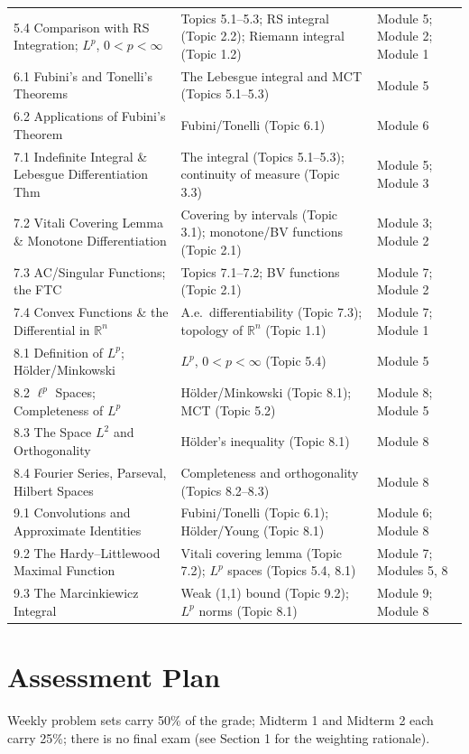 \documentclass[11pt]{article}
\begin{document}
\begin{longtable}{@{}p{5.3cm} p{5.7cm} p{3.4cm}@{}}
5.4 Comparison with RS Integration; $L^p$, $0<p<\infty$ & Topics 5.1--5.3; RS integral (Topic 2.2); Riemann integral (Topic 1.2) & Module 5; Module 2; Module 1 \\
6.1 Fubini's and Tonelli's Theorems & The Lebesgue integral and MCT (Topics 5.1--5.3) & Module 5 \\
6.2 Applications of Fubini's Theorem & Fubini/Tonelli (Topic 6.1) & Module 6 \\
7.1 Indefinite Integral \& Lebesgue Differentiation Thm & The integral (Topics 5.1--5.3); continuity of measure (Topic 3.3) & Module 5; Module 3 \\
7.2 Vitali Covering Lemma \& Monotone Differentiation & Covering by intervals (Topic 3.1); monotone/BV functions (Topic 2.1) & Module 3; Module 2 \\
7.3 AC/Singular Functions; the FTC & Topics 7.1--7.2; BV functions (Topic 2.1) & Module 7; Module 2 \\
7.4 Convex Functions \& the Differential in $\mathbb{R}^n$ & A.e.\ differentiability (Topic 7.3); topology of $\mathbb{R}^n$ (Topic 1.1) & Module 7; Module 1 \\
8.1 Definition of $L^p$; H\"older/Minkowski & $L^p$, $0<p<\infty$ (Topic 5.4) & Module 5 \\
8.2 $\ell^p$ Spaces; Completeness of $L^p$ & H\"older/Minkowski (Topic 8.1); MCT (Topic 5.2) & Module 8; Module 5 \\
8.3 The Space $L^2$ and Orthogonality & H\"older's inequality (Topic 8.1) & Module 8 \\
8.4 Fourier Series, Parseval, Hilbert Spaces & Completeness and orthogonality (Topics 8.2--8.3) & Module 8 \\
9.1 Convolutions and Approximate Identities & Fubini/Tonelli (Topic 6.1); H\"older/Young (Topic 8.1) & Module 6; Module 8 \\
9.2 The Hardy--Littlewood Maximal Function & Vitali covering lemma (Topic 7.2); $L^p$ spaces (Topics 5.4, 8.1) & Module 7; Modules 5, 8 \\
9.3 The Marcinkiewicz Integral & Weak (1,1) bound (Topic 9.2); $L^p$ norms (Topic 8.1) & Module 9; Module 8 \\
\bottomrule
\end{longtable}

\section{Assessment Plan}

Weekly problem sets carry 50\% of the grade; Midterm 1 and Midterm 2 each carry 25\%; there is no final exam (see Section 1 for the weighting rationale).
\end{document}
